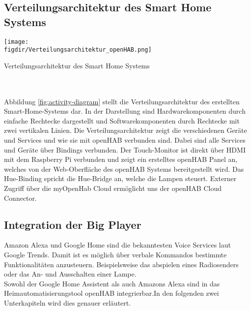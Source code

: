 		
		\subsection{Verteilungsarchitektur des Smart Home Systems}
		
		\smallskip
\begin{minipage}{\textwidth}
	\centering
	\captionsetup{type=figure}
	\texttt{[image: \\figdir/Verteilungsarchitektur\_openHAB.png]}
	\caption{Verteilungsarchitektur des Smart Home Systems \label{fig:activity-diagram}}
\end{minipage}
\\
\\
	Abbildung \ref{fig:activity-diagram} stellt die Verteilungsarchitektur des erstellten Smart-Home-Systems dar. In der Darstellung sind Hardwarekomponenten durch einfache Rechtecke dargestellt und Softwarekomponenten durch Rechtecke mit zwei vertikalen Linien. Die Verteilungsarchitektur zeigt die verschiedenen Geräte und Services und wie sie mit openHAB verbunden sind. Dabei sind alle Services und Geräte über Bindings verbunden. Der Touch-Monitor ist direkt über HDMI mit dem Raspberry Pi verbunden und zeigt ein erstelltes openHAB Panel an, welches von der Web-Oberfläche des openHAB Systems bereitgestellt wird. Das Hue-Binding spricht die Hue-Bridge an, welche die Lampen steuert. Externer Zugriff über die myOpenHab Cloud ermöglicht uns der openHAB Cloud Connector.
	
\subsection{Integration der Big Player}
Amazon Alexa und Google Home sind die bekanntesten Voice Services laut Google Trends. \cite{GOOGLET01:AG} Damit ist es möglich über verbale Kommandos bestimmte Funktionalitäten anzusteuern. Beispielsweise das abspielen eines Radiosenders oder das An- und Ausschalten einer Lampe.\\
Sowohl der Google Home Assistent als auch Amazons Alexa sind in das Heimautomatisierungstool openHAB integrierbar.In den folgenden zwei Unterkapiteln wird dies genauer erläutert.\cite{openHAB02:OH}

